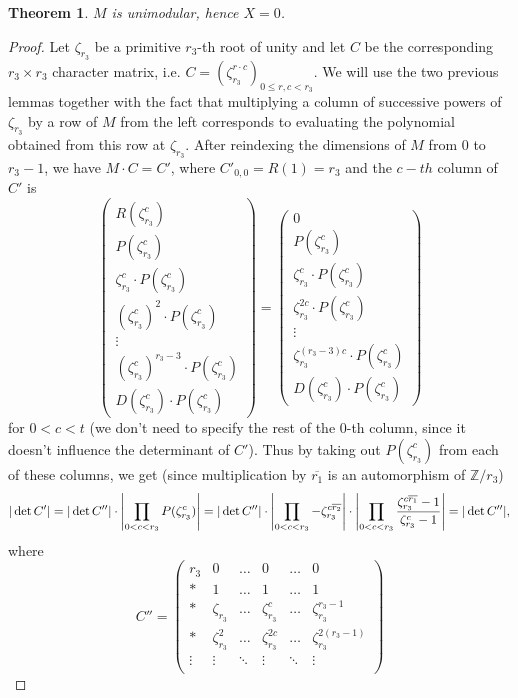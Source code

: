 \documentclass[12pt,a4paper]{article}
\newtheorem{theorem}{Theorem}
\theoremstyle{definition}
\newcommand{\Z}{\mathbb{Z}}
\newcommand{\zt}{\zeta_{r_3}}
\newcommand{\uo}{\overline{r_2}}
\newcommand{\vo}{\overline{r_1}}
\DeclarePairedDelimiter\abs{\lvert}{\rvert}
\begin{document}
\begin{theorem}
$M$ is unimodular, hence $X=0$.
\end{theorem}
\begin{proof}
Let $\zt$ be a primitive $r_3$-th root of unity and let $C$ be the corresponding $r_3\times r_3$ character matrix, i.e. $C=(\zt^{r\cdot c})_{0\leq r,c<r_3}$. We will use the two previous lemmas together with the fact that multiplying a column of successive powers of $\zt$ by a row of $M$ from the left corresponds to evaluating the polynomial obtained from this row at $\zt$. After reindexing the dimensions of $M$ from $0$ to $r_3-1$, we have $M\cdot C=C'$, where $C'_{0,0}=R(1)=r_3$ and the $c-th$ column of $C'$ is
$$
\begin{pmatrix}
R(\zt^c)\\ 
P(\zt^c) \\ 
\zt^c \cdot P(\zt^c) \\ 
(\zt^{c})^2 \cdot P(\zt^c) \\ 
\vdots\\ 
(\zt^{c})^{r_3-3} \cdot P(\zt^c) \\ 
D(\zt^c) \cdot P(\zt^c)
\end{pmatrix}
=
\begin{pmatrix}
0\\ 
P(\zt^c) \\ 
\zt^c \cdot P(\zt^c) \\ 
\zt^{2c} \cdot P(\zt^c) \\ 
\vdots\\ 
\zt^{(r_3-3)c} \cdot P(\zt^c) \\ 
D(\zt^c) \cdot P(\zt^c)
\end{pmatrix}
$$
for $0<c<t$ (we don't need to specify the rest of the $0$-th column, since it doesn't influence the determinant of $C'$). Thus by taking out $P(\zt^c)$ from each of these columns, we get  (since multiplication by $\vo$ is an automorphism of $\Z/r_3$)
$$|\det C'|=|\det C''|\cdot\abs*{\prod_{0<c<r_3}P(\zt^c)}=|\det C''|\cdot\abs*{\prod_{0<c<r_3}-\zt^{c\uo}}\cdot\abs*{\prod_{0<c<r_3}\frac{\zt^{c\vo}-1}{\zt^c-1}}=|\det C''|,$$
where
$$C''=
\begin{pmatrix}
r_3& 0& \dots & 0 & \dots & 0\\ 
*& 1& \dots & 1 & \dots & 1\\ 
*& \zt& \dots & \zt^c & \dots & \zt^{r_3-1}\\ 
*& \zt^2& \dots & \zt^{2c} & \dots & \zt^{2(r_3-1)}\\ 
\vdots& \vdots&\ddots  & \vdots & \ddots & \vdots\\ 

\end{pmatrix}$$
\end{proof}
\end{document}
